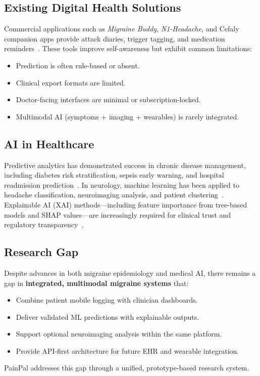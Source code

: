 \documentclass[conference,twocolumn,letterpaper]{IEEEtran}
\begin{document}
\subsection{Existing Digital Health Solutions}
Commercial applications such as \textit{Migraine Buddy}, \textit{N1-Headache}, and Cefaly companion apps provide attack diaries, trigger tagging, and medication reminders~\cite{migraine_buddy}. These tools improve self-awareness but exhibit common limitations:
\begin{itemize}
    \item Prediction is often rule-based or absent.
    \item Clinical export formats are limited.
    \item Doctor-facing interfaces are minimal or subscription-locked.
    \item Multimodal AI (symptoms + imaging + wearables) is rarely integrated.
\end{itemize}

\subsection{AI in Healthcare}
Predictive analytics has demonstrated success in chronic disease management, including diabetes risk stratification, sepsis early warning, and hospital readmission prediction~\cite{rajkomar2018,esteva2019}. In neurology, machine learning has been applied to headache classification, neuroimaging analysis, and patient clustering~\cite{robbins2018}. Explainable AI (XAI) methods---including feature importance from tree-based models and SHAP values---are increasingly required for clinical trust and regulatory transparency~\cite{lundberg2017}.

\subsection{Research Gap}
Despite advances in both migraine epidemiology and medical AI, there remains a gap in \textbf{integrated, multimodal migraine systems} that:
\begin{itemize}
    \item Combine patient mobile logging with clinician dashboards.
    \item Deliver validated ML predictions with explainable outputs.
    \item Support optional neuroimaging analysis within the same platform.
    \item Provide API-first architecture for future EHR and wearable integration.
\end{itemize}
PainPal addresses this gap through a unified, prototype-based research system.
\end{document}
